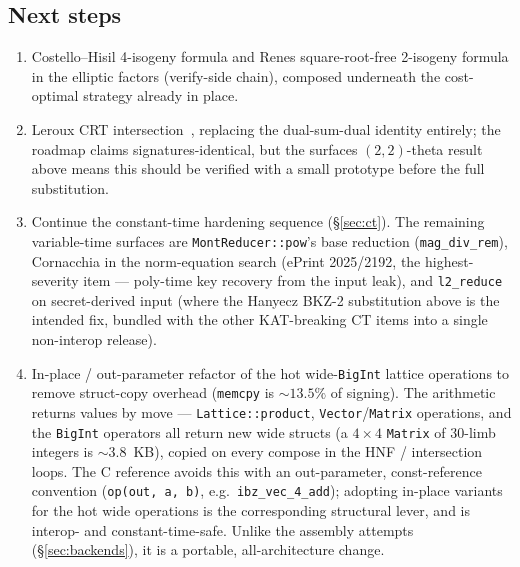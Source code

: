 \subsection{Next steps}
\label{sec:next}

\begin{enumerate}
  \item Costello--Hisil 4-isogeny formula and Renes square-root-free
    2-isogeny formula in the elliptic factors (verify-side chain),
    composed underneath the cost-optimal strategy already in place.
  \item Leroux CRT intersection~\cite{basso2025}, replacing the
    dual-sum-dual identity entirely; the roadmap claims
    signatures-identical, but the surfaces $(2,2)$-theta result above
    means this should be verified with a small prototype before the
    full substitution.
  \item Continue the constant-time hardening sequence
    (\S\ref{sec:ct}).  The remaining variable-time surfaces are
    \texttt{MontReducer::pow}'s base reduction
    (\texttt{mag\_div\_rem}), Cornacchia in the norm-equation search
    (ePrint 2025/2192, the highest-severity item --- poly-time key
    recovery from the input leak), and \texttt{l2\_reduce} on
    secret-derived input (where the Hanyecz BKZ-2 substitution above
    is the intended fix, bundled with the other KAT-breaking CT items
    into a single non-interop release).
  \item In-place / out-parameter refactor of the hot wide-\texttt{BigInt}
    lattice operations to remove struct-copy overhead
    (\texttt{memcpy} is $\sim\!13.5\%$ of signing).  The arithmetic
    returns values by move --- \texttt{Lattice::product},
    \texttt{Vector}/\texttt{Matrix} operations, and the \texttt{BigInt}
    operators all return new wide structs (a $4\times 4$
    \texttt{Matrix} of $30$-limb integers is $\sim\!3.8$~KB), copied on
    every compose in the HNF / intersection loops.  The C reference
    avoids this with an out-parameter, const-reference convention
    (\texttt{op(out, a, b)}, e.g.\ \texttt{ibz\_vec\_4\_add}); adopting
    in-place variants for the hot wide operations is the corresponding
    structural lever, and is interop- and constant-time-safe.  Unlike
    the assembly attempts (\S\ref{sec:backends}), it is a portable,
    all-architecture change.
\end{enumerate}
